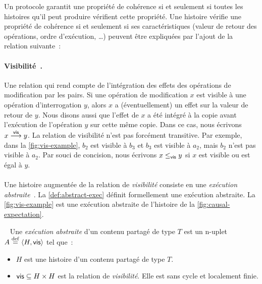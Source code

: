 Un protocole garantit une propriété de cohérence si et seulement si toutes les histoires qu'il peut produire vérifient cette propriété.
Une histoire vérifie une propriété de cohérence si et seulement si ses caractéristiques (valeur de retour des opérations, ordre d'exécution, \ldots) peuvent être expliquées par l'ajout de la relation suivante~:

\paragraph{Visibilité~\autocite{burckhardt_eventualconsistency_2014}.} Une relation qui rend compte de l'intégration des effets des opérations de modification par les pairs.
Si une opération de modification $x$ est visible à une opération d'interrogation $y$, alors $x$ a (éventuellement) un effet sur la valeur de retour de $y$.
Nous disons aussi que l'effet de $x$ a été intégré à la copie avant l'exécution de l'opération $y$ sur cette même copie.
Dans ce cas, nous écrivons $x \vis y$.
La relation de visibilité n'est pas forcément transitive.
Par exemple, dans la \autoref{fig:vis-example}, $b_2$ est visible à $b_3$ et $b_3$ est visible à $a_2$, mais $b_2$ n'est pas visible à $a_2$.
Par souci de concision, nous écrivons $x \viseq y$ si $x$ est visible ou est égal à $y$.


\paragraph{} Une histoire augmentée de la relation de \emph{visibilité} consiste en une \emph{exécution abstraite}~\autocite{burckhardt_eventualconsistency_2014}.
La \autoref{def:abstract-exec} définit formellement une exécution abstraite.
La \autoref{fig:vis-example} est une exécution abstraite de l'histoire de la \autoref{fig:causal-expectation}.

\begin{definition}\label{def:abstract-exec}~\autocite{burckhardt_eventualconsistency_2014}
Une \emph{exécution abstraite} d'un contenu partagé de type $T$ est un n-uplet $A \defeq \tuple*{H, \trm{vis}}$ tel que~:
\begin{itemize}
  \item $H$ est une histoire d'un contenu partagé de type $T$.

  \item $\trm{vis} \subseteq H \times H$ est la relation de \emph{visibilité}. Elle est sans cycle et localement finie.
\end{itemize}
\end{definition}

